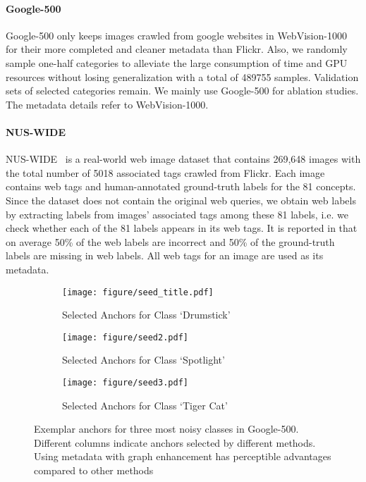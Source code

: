 \documentclass[sigconf]{acmart}
\begin{document}
\paragraph{Google-500} Google-500 only keeps images crawled from google websites in WebVision-1000 for their more completed and cleaner metadata than Flickr. Also, we randomly sample one-half categories to alleviate the large consumption of time and GPU resources without losing generalization with a total of 489755 samples. Validation sets of selected categories remain. We mainly use Google-500 for ablation studies.
The metadata details refer to WebVision-1000. 

\paragraph{NUS-WIDE} NUS-WIDE~\cite{nus-wide-civr09} is a real-world web image dataset that contains 269,648 images with the total number of 5018 associated tags crawled from Flickr. Each image contains web tags and human-annotated ground-truth labels for the 81 concepts. Since the dataset does not contain the original web queries, we obtain web labels by extracting labels from images’ associated tags among these 81 labels, i.e. we check whether each of the 81 labels appears in its web tags. It is reported in \cite{nus-wide-civr09} that on average 50\% of the web labels are incorrect and 50\% of the ground-truth labels are missing in web labels. All web tags for an image are used as its metadata. 

\begin{figure*}[t]
	\centering
	\begin{subfigure}{\textwidth}
		\centering
\texttt{[image: figure/seed\_title.pdf]}  
\caption{Selected Anchors for Class `Drumstick'}
\label{fig:anchor_drumstick}
	\end{subfigure}
	\begin{subfigure}{\textwidth}
		\centering
\texttt{[image: figure/seed2.pdf]}  
\caption{Selected Anchors for Class `Spotlight'}
\label{fig:anchor_spotlight}
	\end{subfigure}
	
	\begin{subfigure}{\textwidth}
		\centering
\texttt{[image: figure/seed3.pdf]}  
\caption{Selected Anchors for Class `Tiger Cat'}
\label{fig:anchor_tigercat}
	\end{subfigure}
	




	\caption{Exemplar anchors for three most noisy classes in Google-500. Different columns indicate anchors selected by different methods. Using metadata with graph enhancement has perceptible advantages compared to other methods}
	\label{fig:seed}
\end{figure*}
\end{document}
